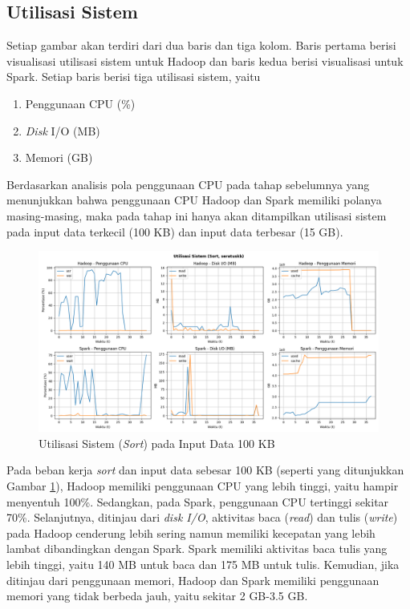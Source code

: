 \subsection{Utilisasi Sistem}
Setiap gambar akan terdiri dari dua baris dan tiga kolom. Baris pertama berisi visualisasi utilisasi sistem untuk Hadoop dan baris kedua berisi visualisasi untuk Spark. Setiap baris berisi tiga utilisasi sistem, yaitu
\begin{enumerate}
\item Penggunaan CPU (\%)
\item \textit{Disk} I/O (MB)
\item Memori (GB)
\end{enumerate}

Berdasarkan analisis pola penggunaan CPU pada tahap sebelumnya yang menunjukkan bahwa penggunaan CPU Hadoop dan Spark memiliki polanya masing-masing, maka pada tahap ini hanya akan ditampilkan utilisasi sistem pada input data terkecil (100 KB) dan input data terbesar (15 GB).

\begin{figure}[h]
    \centering
    \includegraphics[width=1\textwidth]{figures/ch04/5-util-sistem-sort-seratuskb}
    \caption{Utilisasi Sistem (\textit{Sort}) pada Input Data 100 KB}
    \label{fig:5-util-sistem-sort-seratuskb}
\end{figure}

Pada beban kerja \textit{sort} dan input data sebesar 100 KB (seperti yang ditunjukkan Gambar \ref{fig:5-util-sistem-sort-seratuskb}), Hadoop memiliki penggunaan CPU yang lebih tinggi, yaitu hampir menyentuh 100\%. Sedangkan, pada Spark, penggunaan CPU tertinggi sekitar 70\%. Selanjutnya, ditinjau dari \textit{disk I/O}, aktivitas baca (\textit{read}) dan tulis (\textit{write}) pada Hadoop cenderung lebih sering namun memiliki kecepatan yang lebih lambat dibandingkan dengan Spark. Spark memiliki aktivitas baca tulis yang lebih tinggi, yaitu 140 MB untuk baca dan 175 MB untuk tulis. Kemudian, jika ditinjau dari penggunaan memori, Hadoop dan Spark memiliki penggunaan memori yang tidak berbeda jauh, yaitu sekitar 2 GB-3.5 GB.

